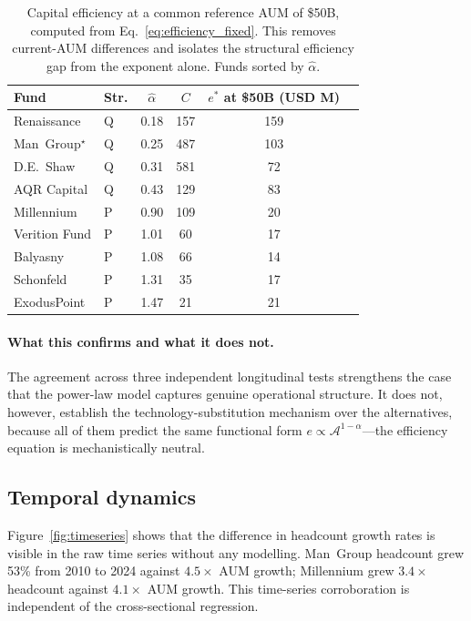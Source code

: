 \documentclass[12pt]{article}
\newcommand{\Ac}{\mathcal{A}}
\newcommand{\alphahat}{\hat{\alpha}}
\begin{document}
\begin{table}[htbp]
\caption{\label{tab:efficiency_fixed}
  Capital efficiency at a common reference AUM of \$50B,
  computed from Eq.~\eqref{eq:efficiency_fixed}.
  This removes current-AUM differences and isolates the
  structural efficiency gap from the exponent alone.
  Funds sorted by $\alphahat$.
}
\setlength{\tabcolsep}{6pt}
\small
\begin{tabular}{@{}llcccc@{}}
\toprule
Fund & Str. & $\alphahat$ & $C$ & $e^*$ at \$50B (USD M) \\
\midrule
Renaissance       & Q & 0.18 & 157 & 159 \\
Man~Group$^\star$ & Q & 0.25 & 487 & 103 \\
D.E.\ Shaw        & Q & 0.31 & 581 &  72 \\
AQR Capital       & Q & 0.43 & 129 &  83 \\
\midrule
Millennium        & P & 0.90 & 109 &  20 \\
Verition Fund     & P & 1.01 &  60 &  17 \\
Balyasny          & P & 1.08 &  66 &  14 \\
Schonfeld         & P & 1.31 &  35 &  17 \\
ExodusPoint       & P & 1.47 &  21 &  21 \\
\bottomrule
\end{tabular}
\end{table}

\paragraph{What this confirms and what it does not.}
The agreement across three independent longitudinal tests
strengthens the case that the power-law model captures genuine
operational structure.
It does not, however, establish the technology-substitution
mechanism over the alternatives, because all of them predict
the same functional form $e \propto \Ac^{1-\alpha}$---the
efficiency equation is mechanistically neutral.

\subsection{Temporal dynamics}

Figure~\ref{fig:timeseries} shows that the difference in
headcount growth rates is visible in the raw time series
without any modelling.
Man~Group headcount grew 53\% from 2010 to 2024 against
$4.5\times$ AUM growth; Millennium grew $3.4\times$ headcount
against $4.1\times$ AUM growth.
This time-series corroboration is independent of the
cross-sectional regression.
\end{document}
